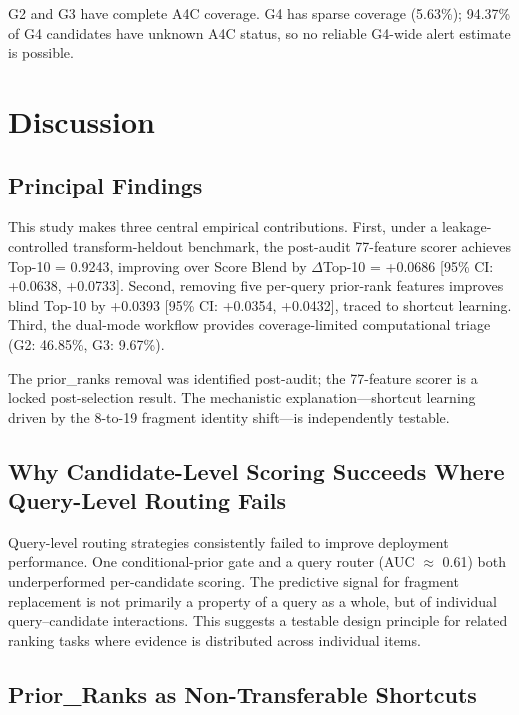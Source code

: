 \documentclass[12pt,letterpaper]{article}
\begin{document}
G2 and G3 have complete A4C coverage. G4 has sparse coverage (5.63\%); 94.37\% of G4 candidates have unknown A4C status, so no reliable G4-wide alert estimate is possible.


\section{Discussion}

\subsection{Principal Findings}

This study makes three central empirical contributions. First, under a leakage-controlled transform-heldout benchmark, the post-audit 77-feature scorer achieves Top-10 = 0.9243, improving over Score Blend by $\Delta$Top-10 = +0.0686 [95\% CI: +0.0638, +0.0733]. Second, removing five per-query prior-rank features improves blind Top-10 by +0.0393 [95\% CI: +0.0354, +0.0432], traced to shortcut learning. Third, the dual-mode workflow provides coverage-limited computational triage (G2: 46.85\%, G3: 9.67\%).

The prior\_ranks removal was identified post-audit; the 77-feature scorer is a locked post-selection result. The mechanistic explanation---shortcut learning driven by the 8-to-19 fragment identity shift---is independently testable.

\subsection{Why Candidate-Level Scoring Succeeds Where Query-Level Routing Fails}

Query-level routing strategies consistently failed to improve deployment performance. One conditional-prior gate and a query router (AUC $\approx$ 0.61) both underperformed per-candidate scoring. The predictive signal for fragment replacement is not primarily a property of a query as a whole, but of individual query--candidate interactions. This suggests a testable design principle for related ranking tasks where evidence is distributed across individual items.

\subsection{Prior\_Ranks as Non-Transferable Shortcuts}
\end{document}
